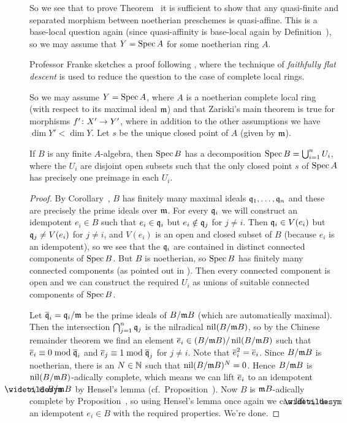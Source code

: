 \documentclass[a4paper,parskip=half,numbers=enddot, DIV=12]{scrreprt}
\begin{document}
So we see that to prove Theorem~ it is sufficient to show that any quasi-finite and separated morphism between noetherian preschemes is quasi-affine. This is a base-local question again (since quasi-affinity is base-local again by Definition~), so we may assume that $Y=\operatorname{Spec} A$ for some noetherian ring $A$.

Professor Franke sketches a proof following \cite[Exposé~VIII.6]{sga1}, where the technique of \emph{faithfully flat descent} is used to reduce the question to the case of complete local rings.

So we may assume $Y=\operatorname{Spec} A$, where $A$ is a noetherian complete local ring (with respect to its maximal ideal $\mathfrak{m}$) and that Zariski's main theorem is true for morphisms $f'\colon X'\morphism Y'$, where in addition to the other assumptions we have $\dim Y'<\dim Y$. Let $s$ be the unique closed point of $A$ (given by $\mathfrak{m}$).
\begin{lem}
	If $B$ is any finite $A$-algebra, then $\operatorname{Spec} B$ has a decomposition $\operatorname{Spec} B=\bigcup_{i=1}^nU_i$, where the $U_i$ are disjoint open subsets such that the only closed point $s$ of $\operatorname{Spec} A$ has precisely one preimage in each $U_i$.
\end{lem}
\begin{proof}
	By Corollary~, $B$ has finitely many maximal ideals $\mathfrak{q}_1,\ldots,\mathfrak{q}_n$ and these are precisely the prime ideals over $\mathfrak{m}$. For every $\mathfrak{q}_i$ we will construct an idempotent $e_i\in B$ such that $e_i\in \mathfrak{q}_i$ but $e_i\notin\mathfrak{q}_j$ for $j\neq i$. Then $\mathfrak{q}_i\in V(e_i)$ but $\mathfrak{q}_j\neq V(e_i)$ for $j\neq i$, and $V(e_i)$ is an open and closed subset of $B$ (because $e_i$ is an idempotent), so we see that the $\mathfrak{q}_i$ are contained in distinct connected components of $\operatorname{Spec} B$. But $B$ is noetherian, so $\operatorname{Spec} B$ has finitely many connected components (as pointed out in \cite[Lemma~2.4.2]{alggeo1}). Then every connected component is open and we can construct the required $U_i$ as unions of suitable connected components of $\operatorname{Spec} B$.
	
	Let $\overline{\mathfrak{q}}_i=\mathfrak{q}_i/\mathfrak{m}$ be the prime ideals of $B/\mathfrak{m} B$ (which are automatically maximal). Then the intersection $\bigcap_{j=1}^n\mathfrak{q}_j$ is the nilradical $\operatorname{nil}(B/\mathfrak{m} B)$, so by the Chinese remainder theorem we find an element $\overline{e}_i\in (B/\mathfrak{m} B)/\operatorname{nil}(B/\mathfrak{m} B)$ such that $\overline{e}_i\equiv 0\bmod \overline{\mathfrak{q}}_i$ and $\overline{e}_j\equiv 1\bmod\overline{\mathfrak{q}}_j$ for $j\neq i$. Note that $\overline{e}_i^2=\overline{e}_i$. Since $B/\mathfrak{m} B$ is noetherian, there is an $N\in\mathbb{N}$ such that $\operatorname{nil}(B/\mathfrak{m} B)^N=0$. Hence $B/\mathfrak{m} B$ is $\operatorname{nil}(B/\mathfrak{m} B)$-adically complete, which means we can lift $\overline{e}_i$ to an idempotent $\snake{e}_i\in B/\mm B$ by Hensel's lemma (cf.\ Proposition~). Now $B$ is $\mathfrak{m} B$-adically complete by Proposition~, so using Hensel's lemma once again we can lift $\snake{e}_i$ to an idempotent $e_i\in B$ with the required properties. We're done.
\end{proof}
\end{document}
